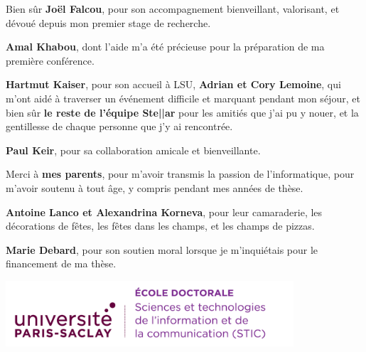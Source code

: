 \documentclass[english,12pt,a4paper]{book}
\begin{document}
Bien s\^ur \textbf{Jo\"el Falcou}, pour son accompagnement bienveillant,
valorisant, et d\'evou\'e depuis mon premier stage de recherche.


\textbf{Amal Khabou}, dont l'aide m'a \'et\'e pr\'ecieuse pour la pr\'eparation
de ma premi\`ere conf\'erence.

\textbf{Hartmut Kaiser}, pour son accueil \`a LSU,
\textbf{Adrian et Cory Lemoine}, qui m'ont aid\'e \`a
traverser un \'ev\'enement difficile et marquant pendant mon s\'ejour,
et bien s\^ur \textbf{le reste de l'\'equipe Ste||ar} pour les amiti\'es
que j'ai pu y nouer, et la gentillesse de chaque personne que j'y ai
rencontr\'ee.

\textbf{Paul Keir}, pour sa collaboration amicale et bienveillante.

Merci \`a \textbf{mes parents},
pour m'avoir transmis la passion de l'informatique,
pour m'avoir soutenu \`a tout \^age,
y compris pendant mes ann\'ees de th\`ese.


\textbf{Antoine Lanco et Alexandrina Korneva}, pour leur camaraderie, les
d\'ecorations de f\^etes, les f\^etes dans les champs, et les champs de pizzas.

\textbf{Marie Debard}, pour son soutien moral lorsque je m'inqui\'etais
pour le financement de ma th\`ese.

\thispagestyle{empty}

\noindent
\includegraphics[height=2.45cm]{ups/logo_STIC.png}
\vspace{1cm}

\small
\end{document}
